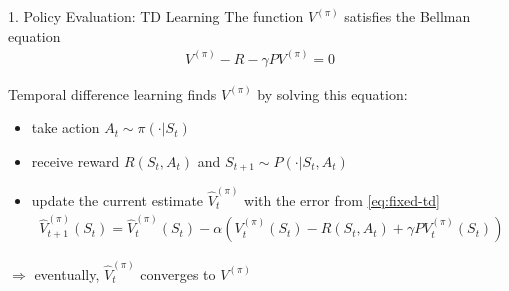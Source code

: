 \documentclass[12pt,aspectratio=169]{beamer}
\begin{document}
\begin{frame}{1. Policy Evaluation: TD Learning}
  The function $V^{(\pi)}$ satisfies the Bellman equation
  \begin{align}
    \label{eq:fixed-td}     \tag{$\star$}
    V^{(\pi)} - R - \gamma P V^{(\pi)} = 0
  \end{align}

  \pause

  Temporal difference learning finds $V^{(\pi)}$ by solving this equation: 
  \begin{itemize}
  \item take action $A_t \sim \pi(\cdot|S_t)$
  \item receive reward $R(S_t, A_t)$ and $S_{t+1} \sim P(\cdot|S_t, A_t)$
  \item update the current estimate $\hat{V}_t^{(\pi)}$ with the error from \eqref{eq:fixed-td}
    \begin{align*}
      \hat{V}_{t+1}^{(\pi)}(S_t) = \hat{V}_t^{(\pi)}(S_t) - \alpha ( V_t^{(\pi)}(S_t) - R(S_t, A_t) + \gamma P V_t^{(\pi)}(S_t)  )
    \end{align*}
  \end{itemize}

  \textcolor{amaranth}{$\boldsymbol{\Rightarrow}$}
  eventually, $\hat{V}_t^{(\pi)}$ converges to $ V^{(\pi)}$
  
\end{frame}






\end{document}
